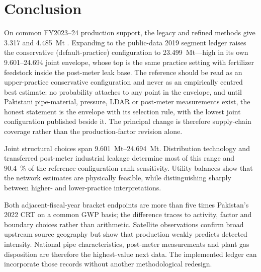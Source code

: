 \section{Conclusion}
\label{sec:conclusion}

On common FY2023--24 production support, the legacy and refined methods give
\SI{3.317}{} and \SI{4.485}{\mega\tonne} \COe{}. Expanding to the public-data 2019 segment
ledger raises the conservative (default-practice) configuration to
\SI{23.499}{\mega\tonne}---high in its own 9.601--24.694 joint envelope, whose top is the
same practice setting with fertilizer feedstock inside the post-meter leak base. The
reference should be read as an
upper-practice conservative configuration and never as an empirically centred
best estimate: no probability attaches to any point in the envelope, and until
Pakistani pipe-material, pressure, LDAR or post-meter measurements exist, the
honest statement is the envelope with its selection rule, with the lowest joint
configuration published beside it. The principal change is
therefore supply-chain coverage rather than the production-factor revision alone.

Joint structural choices span \SIrange{9.601}{24.694}{\mega\tonne}. Distribution technology
and transferred post-meter industrial leakage determine most of this range and
\SI{90.4}{\percent} of the reference-configuration rank sensitivity. Utility balances show that
the network estimates are physically feasible, while distinguishing sharply between higher- and
lower-practice interpretations.

Both adjacent-fiscal-year bracket endpoints are more than five times Pakistan's 2022 CRT
on a common GWP basis;
the difference traces to activity, factor and boundary choices rather than arithmetic. Satellite
observations confirm broad upstream source geography but show that production weakly predicts
detected intensity. National pipe characteristics, post-meter measurements and plant gas
disposition are therefore the highest-value next data. The implemented ledger can incorporate
those records without another methodological redesign.
